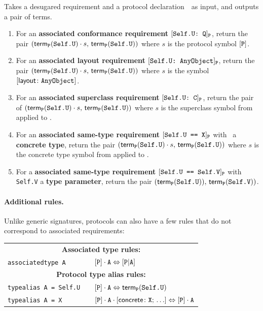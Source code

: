 \documentclass[../generics]{subfiles}
\begin{document}
\begin{algorithm}\label{build rule protocol}
Takes a desugared requirement and a protocol declaration~\tP\ as input, and outputs a pair of terms.
\begin{enumerate}
\item For an \textbf{associated conformance requirement} $[\texttt{Self.U:~Q}]_{\texttt{P}}$, return the pair $(\mathsf{term}_{\texttt{P}}(\texttt{Self.U})\cdot s,\,\mathsf{term}_{\texttt{P}}(\texttt{Self.U}))$ where $s$ is the protocol symbol $[\texttt{P}]$.
\item For an \textbf{associated layout requirement} $[\texttt{Self.U:~AnyObject}]_{\texttt{P}}$, return the pair $(\mathsf{term}_{\texttt{P}}(\texttt{Self.U})\cdot s,\,\mathsf{term}_{\texttt{P}}(\texttt{Self.U}))$ where $s$ is the symbol $[\mathsf{layout}\colon\texttt{AnyObject}]$.
\item For an \textbf{associated superclass requirement} $[\texttt{Self.U:~C}]_{\texttt{P}}$, return the pair of $(\mathsf{term}_{\texttt{P}}(\texttt{Self.U})\cdot s,\,\mathsf{term}_{\texttt{P}}(\texttt{Self.U}))$ where $s$ is the superclass symbol from  applied to \tC.
\item For an \textbf{associated same-type requirement} $[\texttt{Self.U == X}]_{\texttt{P}}$ with \tX\ a \textbf{concrete type}, return the pair $(\mathsf{term}_{\texttt{P}}(\texttt{Self.U})\cdot s,\,\mathsf{term}_{\texttt{P}}(\texttt{Self.U}))$ where $s$ is the concrete type symbol from  applied to \tX.
\item For a \textbf{associated same-type requirement} $[\texttt{Self.U == Self.V}]_{\texttt{P}}$ with \texttt{Self.V} a \textbf{type parameter}, return the pair $(\mathsf{term}_{\texttt{P}}(\texttt{Self.U})),\, \mathsf{term}_{\texttt{P}}(\texttt{Self.V}))$.
\end{enumerate}
\end{algorithm}

\paragraph{Additional rules.} Unlike generic signatures, protocols can also have a few rules that do not correspond to associated requirements:
\begin{center}
\begin{tabular}{lll}
\toprule
\multicolumn{3}{c}{\textbf{Associated type rules:}}\\
\verb|associatedtype A|&& $[\texttt{P}]\cdot\texttt{A} \Leftrightarrow [\texttt{P}|\texttt{A}]$\\
\midrule
\multicolumn{3}{c}{\textbf{Protocol type alias rules:}}\\
\verb|typealias A = Self.U|&& $[\texttt{P}]\cdot\texttt{A} \Leftrightarrow \mathsf{term}_{\texttt{P}}(\texttt{Self.U})$\\
\verb|typealias A = X|&& $[\texttt{P}]\cdot\texttt{A} \cdot [\mathsf{concrete}\colon \texttt{X};\, \ldots] \Leftrightarrow [\texttt{P}]\cdot\texttt{A}$\\
\bottomrule
\end{tabular}
\end{center}
\end{document}

